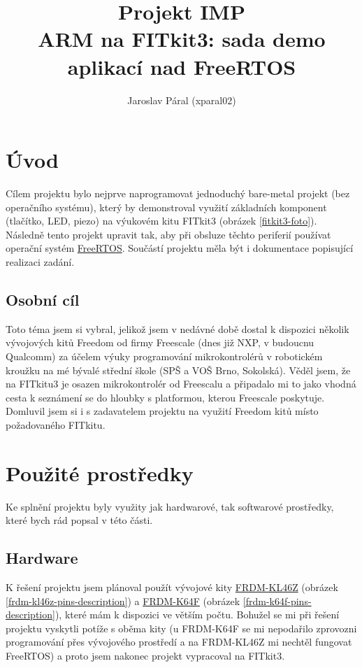 \documentclass[a4paper]{article}
\title{Projekt IMP \\ ARM na FITkit3: sada demo aplikací nad FreeRTOS}
\author{Jaroslav Páral (xparal02)}
\begin{document}
\maketitle

\section{Úvod}
Cílem projektu bylo nejprve naprogramovat jednoduchý bare-metal projekt (bez operačního systému), který by demonstroval využití základních komponent (tlačítko, LED, piezo) na výukovém kitu FITkit3 (obrázek \ref{fitkit3-foto}). Následně tento projekt upravit tak, aby při obsluze těchto periferií používat operační systém \href{http://www.freertos.org/}{FreeRTOS}. Součástí projektu měla být i dokumentace popisující realizaci zadání.

\subsection{Osobní cíl}
Toto téma jsem si vybral, jelikož jsem v nedávné době dostal k dispozici několik vývojových kitů Freedom od firmy Freescale (dnes již NXP, v budoucnu Qualcomm) za účelem výuky programování mikrokontrolérů v robotickém kroužku na mé bývalé střední škole (SPŠ a VOŠ Brno, Sokolská).  Věděl jsem, že na FITkitu3 je osazen mikrokontrolér od Freescalu a připadalo mi to jako vhodná cesta k seznámení se do hloubky s platformou, kterou Freescale poskytuje. Domluvil jsem si i s zadavatelem projektu na využití Freedom kitů místo požadovaného FITkitu.

\section{Použité prostředky}

Ke splnění projektu byly využity jak hardwarové, tak softwarové prostředky, které bych rád popsal v této části.

\subsection{Hardware}

K řešení projektu jsem plánoval použít vývojové kity \href{http://www.nxp.com/products/software-and-tools/hardware-development-tools/freedom-development-boards/freedom-development-platform-for-kinetis-kl3x-and-kl4x-mcus:FRDM-KL46Z?tid=vanFRDM-KL46Z}{FRDM-KL46Z} (obrázek \ref{frdm-kl46z-pins-description}) a \href{http://www.nxp.com/products/software-and-tools/hardware-development-tools/freedom-development-boards/freedom-development-platform-for-kinetis-k64-k63-and-k24-mcus:FRDM-K64F?tid=vanFRDM-K64F}{FRDM-K64F} (obrázek \ref{frdm-k64f-pins-description}), které mám k dispozici ve větším počtu. Bohužel se mi při řešení projektu vyskytli potíže s oběma kity (u FRDM-K64F se mi nepodařilo zprovozni programování přes vývojového prostředí a na FRDM-KL46Z mi nechtěl fungovat FreeRTOS) a proto jsem nakonec projekt vypracoval na FITkit3. 
\end{document}
